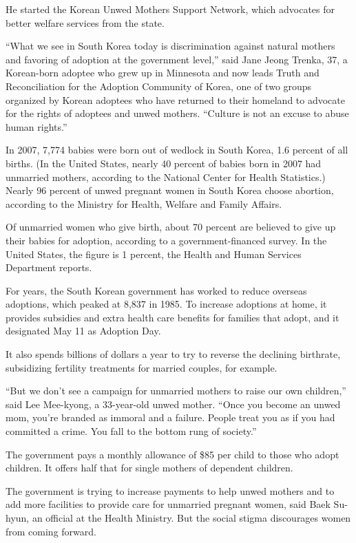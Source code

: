 ﻿\documentclass[12pt]{article}
\begin{document}
He started the Korean Unwed Mothers Support Network, which advocates for better welfare services
from the state.

``What we see in South Korea today is discrimination against natural mothers and favoring of
adoption at the government level,'' said Jane Jeong Trenka, 37, a Korean-born adoptee who grew up in
Minnesota and now leads Truth and Reconciliation for the Adoption Community of Korea, one of two
groups organized by Korean adoptees who have returned to their homeland to advocate for the rights
of adoptees and unwed mothers. ``Culture is not an excuse to abuse human rights.''

In 2007, 7,774 babies were born out of wedlock in South Korea, 1.6 percent of all births. (In the
United States, nearly 40 percent of babies born in 2007 had unmarried mothers, according to the
National Center for Health Statistics.) Nearly 96 percent of unwed pregnant women in South Korea
choose abortion, according to the Ministry for Health, Welfare and Family Affairs.

Of unmarried women who give birth, about 70 percent are believed to give up their babies for
adoption, according to a government-financed survey. In the United States, the figure is 1 percent,
the Health and Human Services Department reports.

For years, the South Korean government has worked to reduce overseas adoptions, which peaked at
8,837 in 1985. To increase adoptions at home, it provides subsidies and extra health care benefits
for families that adopt, and it designated May 11 as Adoption Day.

It also spends billions of dollars a year to try to reverse the declining birthrate, subsidizing
fertility treatments for married couples, for example.

``But we don't see a campaign for unmarried mothers to raise our own children,'' said Lee Mee-kyong,
a 33-year-old unwed mother. ``Once you become an unwed mom, you're branded as immoral and a failure.
People treat you as if you had committed a crime. You fall to the bottom rung of society.''

The government pays a monthly allowance of \$85 per child to those who adopt children. It offers
half that for single mothers of dependent children.

The government is trying to increase payments to help unwed mothers and to add more facilities to
provide care for unmarried pregnant women, said Baek Su-hyun, an official at the Health Ministry.
But the social stigma discourages women from coming forward.
\end{document}
